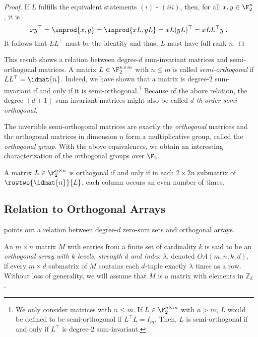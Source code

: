\begin{proof}
If $L$ fulfills the equivalent statements $(i)$ - $(iii)$,  then, for all $x,y \in \F_2^{n}$, it is 
\[ xy^\top = \inprod{ x,y} = \inprod{xL,yL} = xL(yL)^\top =  xLL^{\top}y\;.\]
It follows that $LL^\top$ must be the identity and thus, $L$ must have full rank $n$.
\end{proof}

This result shows a relation between degree-$d$ sum-invariant matrices and semi-orthogonal matrices. A matrix $L \in \F_2^{n \times m}$ with $n \leq m$ is called \emph{semi-orthogonal} if $LL^\top = \idmat{n}$. Indeed, we have shown that a matrix is degree-$2$ sum-invariant if and only if it is semi-orthogonal.\footnote{We only consider matrices with $n \leq m$. If $L \in \F_2^{n\times m}$ with $n > m$, $L$ would be defined to be semi-orthogonal if $L^\top L = I_m$. Then, $L$ is semi-orthogonal if and only if $L^\top$ is degree-$2$ sum-invariant.} Because of the above relation, the degree-$(d+1)$ sum-invariant matrices might also be called \emph{$d$-th order semi-orthogonal}.

The invertible semi-orthogonal matrices are exactly the \emph{orthogonal} matrices and the orthogonal matrices in dimension $n$ form a multiplicative group, called the \emph{orthogonal group}. With the above equivalences, we obtain an interesting characterization of the orthogonal groups over $\F_2$.  

\begin{corollary}
A matrix $L \in \F_2^{n \times n}$ is orthogonal if and only if in each $2 \times 2n$ submatrix of $\rowtwo{\idmat{n}}{L}$, each column occurs an even number of times. 
\end{corollary}

\subsection{Relation to Orthogonal Arrays}
 points out a relation between degree-$d$ zero-sum sets and orthogonal arrays.

\begin{definition}
An $m \times n$ matrix $M$ with entries from a finite set of cardinality $k$ is said to be an \emph{orthogonal
array with $k$ levels, strength $d$ and index $\lambda$}, denoted $OA(m,n,k,d)$, if every $m \times d$ submatrix of $M$ contains each $d$-tuple exactly $\lambda$ times as a row. Without loss of generality, we will assume that $M$ is a matrix with elements in $\mathbb{Z}_k$. 
\end{definition}

